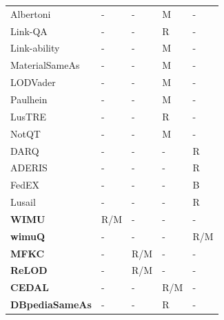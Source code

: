 \begin{table}[H]
\begin{center}
\begin{tabular}{@{}lllll@{}}
Albertoni\cite{Albertoni:2013:ALQ:2457317.2457327} & - & - & M & - \\
Link-QA\cite{Guret2012AssessingLD} & - & - & R & - \\
Link-ability\cite{yaghouti2015metric} & - & - & M & - \\
MaterialSameAs\cite{casanova2014materialized} & - & - & M & - \\
LODVader\cite{netoassessing} & - & - & M & - \\
Paulhein\cite{paulheim2014identifying} & - & - & M & - \\ 
LusTRE\cite{albertoni2016linkset} & - & - & R & - \\ 
NotQT\cite{Melo2013NotQT} & - & - & M & - \\ 
DARQ\cite{darq2008} & - & - & - & R \\ 
ADERIS\cite{aderis2011} & - & - & - & R \\
FedEX\cite{fedx2011} & - & - & - & B \\
Lusail\cite{abdelaziz2017lusail} & - & - & - & R \\
\textbf{WIMU}\cite{abdelaziz2017lusail} & R/M & - & - & - \\
\textbf{wimuQ}\cite{abdelaziz2017lusail} & - & - & - & R/M \\
\textbf{MFKC}\cite{abdelaziz2017lusail} & - & R/M & - & - \\
\textbf{ReLOD}\cite{abdelaziz2017lusail} & - & R/M & - & - \\
\textbf{CEDAL}\cite{abdelaziz2017lusail} & - & - & R/M & - \\
\textbf{DBpediaSameAs}\cite{abdelaziz2017lusail} & - & - & R & - \\
\bottomrule
\end{tabular}
\end{center}
\end{table}

